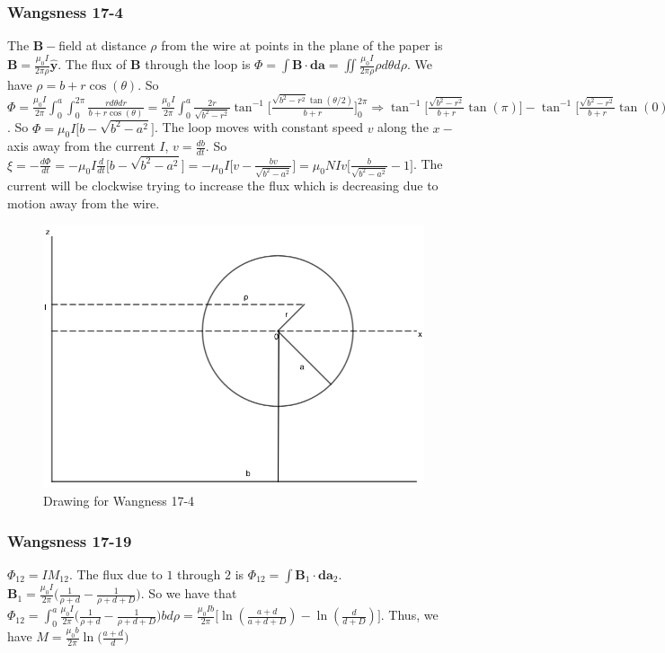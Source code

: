 \documentclass[crop=false,class=book,oneside]{standalone}
\begin{document}
            \subsubsection{Wangsness 17-4}
            The $\mathbf{B}-$field at distance $\rho$ from the wire at points in the plane of the paper is $\mathbf{B} = \frac{\mu_0 I}{2\pi \rho} \hat{\mathbf{y}}$. The flux of $\mathbf{B}$ through the loop is $\Phi = \int \mathbf{B}\cdot \mathbf{da} = \iint \frac{\mu_0 I}{2\pi \rho}\rho d\theta d\rho$. We have $\rho = b+r\cos(\theta)$. So $\Phi = \frac{\mu_0 I}{2\pi} \int_{0}^{a} \int_{0}^{2\pi} \frac{r d\theta dr}{b+r\cos(\theta)} = \frac{\mu_0 I}{2\pi} \int_{0}^{a} \frac{2r}{\sqrt{b^2-r^2}}\tan^{-1}\big[\frac{\sqrt{b^2-r^2}\tan(\theta/2)}{b+r}\big]_{0}^{2\pi} \Rightarrow \tan^{-1}\big[\frac{\sqrt{b^2-r^2}}{b+r}\tan(\pi)\big] - \tan^{-1}\big[ \frac{\sqrt{b^2-r^2}}{b+r}\tan(0)\big]$. So $\Phi = \mu_0 I\big[b-\sqrt{b^2-a^2}\big]$. The loop moves with constant speed $v$ along the $x-$axis away from the current $I$, $v = \frac{db}{dt}$. So $\xi = -\frac{d\Phi}{dt} = -\mu_0 I \frac{d}{dt}\big[b-\sqrt{b^2-a^2}\big] = -\mu_0 I\big[ v-\frac{bv}{\sqrt{b^2-a^2}}\big] = \mu_0 NIv\big[ \frac{b}{\sqrt{b^2-a^2}}-1\big]$. The current will be clockwise trying to increase the flux which is decreasing due to motion away from the wire.
            \begin{figure}[htbp]
                \centering
                \captionsetup{type=figure}
                \includegraphics[scale=0.4]{17-4.png}
                \caption[Drawing for Wangsness 17-4]{Drawing for Wangness 17-4}
            \end{figure}
            \subsubsection{Wangsness 17-19}
            $\Phi_{12} = IM_{12}$. The flux due to $1$ through $2$ is $\Phi_{12} = \int \mathbf{B}_1 \cdot \mathbf{da}_2$. $\mathbf{B}_1 = \frac{\mu_0 I}{2\pi} \big( \frac{1}{\rho+d}- \frac{1}{\rho+d+D}\big)$. So we have that $\Phi_{12} = \int_{0}^{a} \frac{\mu_0 I}{2\pi} \big(\frac{1}{\rho+d}- \frac{1}{\rho+d+D}\big) bd\rho = \frac{\mu_0 Ib}{2\pi}\big[ \ln(\frac{a+d}{a+d+D}) - \ln(\frac{d}{d+D})\big]$. Thus, we have $M = \frac{\mu_0 b}{2\pi} \ln\big(\frac{a+d}{d}\big)$
\end{document}
